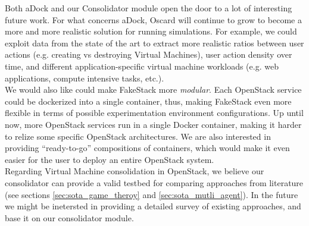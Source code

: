 Both aDock and our Consolidator module open the door to a lot of interesting future work. For what concerns aDock, Oscard will continue to grow to become a more and more realistic solution for running simulations. For example, we could exploit data from the state of the art to extract more realistic ratios between user actions (e.g. creating vs destroying Virtual Machines), user action density over time, and different application-specific virtual machine workloads (e.g. web applications, compute intensive tasks, etc.).\\
We would also like could make FakeStack more \emph{modular}. Each OpenStack service could be dockerized into a single container, thus, making FakeStack even more flexible in terms of possible experimentation environment configurations. Up until now, more OpenStack services run in a single Docker container, making it harder to relize some specific OpenStack architectures. We are also interested in providing ``ready-to-go'' compositions of containers, which would make it even easier for the user to deploy an entire OpenStack system.\\
Regarding Virtual Machine consolidation in OpenStack, we believe our consolidator can provide a valid testbed for comparing approaches from literature (see sections \ref{sec:sota_game_theroy} and \ref{sec:sota_mutli_agent}). In the future we might be inetersted in providing a detailed survey of existing approaches, and base it on our consolidator module.